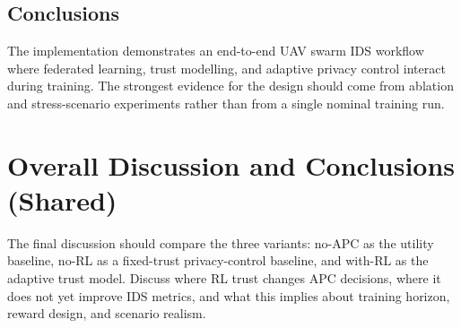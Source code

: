 \documentclass[11pt,a4paper,oneside]{report}
\begin{document}
\section{Conclusions}
The implementation demonstrates an end-to-end UAV swarm IDS workflow where
federated learning, trust modelling, and adaptive privacy control interact
during training. The strongest evidence for the design should come from ablation
and stress-scenario experiments rather than from a single nominal training run.


\chapter{Overall Discussion and Conclusions (Shared)}
\label{ch:overall}

The final discussion should compare the three variants: no-APC as the utility
baseline, no-RL as a fixed-trust privacy-control baseline, and with-RL as the
adaptive trust model. Discuss where RL trust changes APC decisions, where it
does not yet improve IDS metrics, and what this implies about training horizon,
reward design, and scenario realism.
\end{document}
